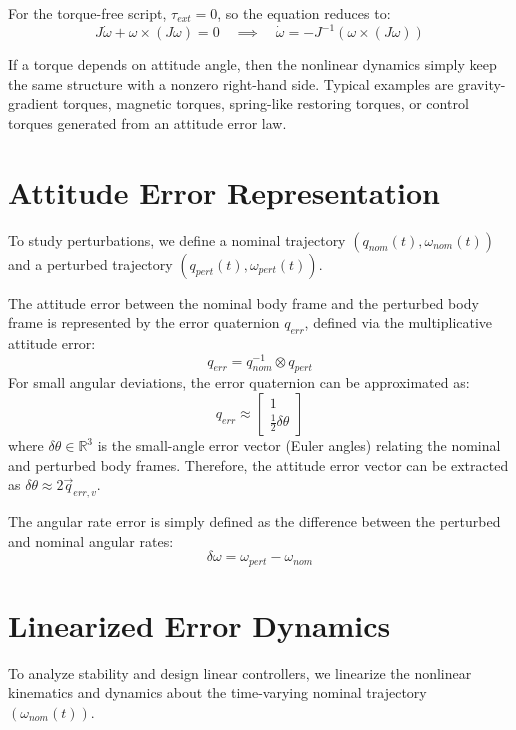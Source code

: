 \documentclass[11pt]{article}
\begin{document}
For the torque-free script, $\tau_{ext} = 0$, so the equation reduces to:
\begin{equation}
    J \dot{\omega} + \omega \times (J\omega) = 0 \quad \implies \quad \dot{\omega} = -J^{-1} (\omega \times (J\omega))
\end{equation}

If a torque depends on attitude angle, then the nonlinear dynamics simply keep the same structure with a nonzero right-hand side. Typical examples are gravity-gradient torques, magnetic torques, spring-like restoring torques, or control torques generated from an attitude error law.

\section{Attitude Error Representation}
To study perturbations, we define a nominal trajectory $(q_{nom}(t), \omega_{nom}(t))$ and a perturbed trajectory $(q_{pert}(t), \omega_{pert}(t))$. 

The attitude error between the nominal body frame and the perturbed body frame is represented by the error quaternion $q_{err}$, defined via the multiplicative attitude error:
\begin{equation}
    q_{err} = q_{nom}^{-1} \otimes q_{pert}
\end{equation}
For small angular deviations, the error quaternion can be approximated as:
\begin{equation}
    q_{err} \approx \begin{bmatrix} 1 \\ \frac{1}{2} \delta\theta \end{bmatrix}
\end{equation}
where $\delta\theta \in \mathbb{R}^3$ is the small-angle error vector (Euler angles) relating the nominal and perturbed body frames. Therefore, the attitude error vector can be extracted as $\delta\theta \approx 2 \vec{q}_{err, v}$.

The angular rate error is simply defined as the difference between the perturbed and nominal angular rates:
\begin{equation}
    \delta\omega = \omega_{pert} - \omega_{nom}
\end{equation}

\section{Linearized Error Dynamics}
To analyze stability and design linear controllers, we linearize the nonlinear kinematics and dynamics about the time-varying nominal trajectory $(\omega_{nom}(t))$. 
\end{document}

